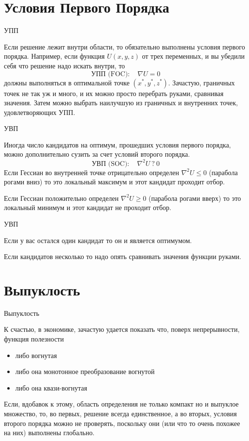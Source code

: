 \documentclass{beamer}
\begin{document}
\section{Условия Первого Порядка}

\begin{frame}{УПП}

Если решение лежит внутри области, то обязательно выполнены условия первого порядка. Например, если функция $U(x, y, z)$ от трех переменных, и вы убедили себя что решение надо искать внутри, то
$$\text{УПП (FOC)}: \quad  \nabla U = 0$$ 
должны выполняться в оптимальной точке $(x^{\ast}, y^{\ast}, z^{\ast})$. Зачастую, граничных точек не так уж и много, и их можно просто перебрать руками, сравнивая значения. Затем можно выбрать наилучшую из граничных и внутренних точек, удовлетворяющих УПП.

\end{frame}

\begin{frame}{УВП}

Иногда число кандидатов на оптимум, прошедших условия первого порядка,  можно дополнительно сузить за счет условий второго порядка.
$$\text{УВП (SOC)}: \quad  \nabla^2 U \ ? \ 0$$
Если Гессиан во внутренней точке отрицательно определен $\nabla^2 U \leqslant 0$ (парабола рогами вниз) то это локальный максимум и этот кандидат проходит отбор. 

Если Гессиан положительно определен $\nabla^2 U \geqslant 0$ (парабола рогами вверх) то это локальный минимум и этот кандидат не проходит отбор.

\end{frame}

\begin{frame}{УВП}

Если у вас остался один кандидат то он и является оптимумом. 

Если кандидатов несколько то надо опять сравнивать значения функции руками.

\end{frame}

\section{Выпуклость}

\begin{frame}{Выпуклость}

К счастью, в экономике, зачастую удается показать что, поверх непрерывности, функция полезности

\begin{itemize}
\item либо вогнутая
\item либо она монотонное преобразование вогнутой
\item либо она квази-вогнутая
\end{itemize}

Если, вдобавок к этому, область определения не только компакт но и выпуклое множество, то, во первых, решение всегда единственное, а во вторых, условия второго порядка можно не проверять, поскольку они (или что то очень похожее на них) выполнены глобально.

\end{frame}
\end{document}
